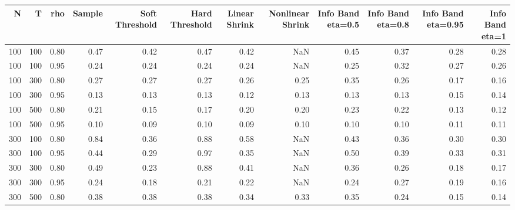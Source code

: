 \begin{tabular}{rrrrrrrrrrrr}
\toprule
  N &   T &  rho &  Sample &  Soft Threshold &  Hard Threshold &  Linear Shrink &  Nonlinear Shrink &  Info Band eta=0.5 &  Info Band eta=0.8 &  Info Band eta=0.95 &  Info Band eta=1 \\
\midrule
100 & 100 & 0.80 &    0.47 &            0.42 &            0.47 &           0.42 &               NaN &               0.45 &               0.37 &                0.28 &             0.28 \\
100 & 100 & 0.95 &    0.24 &            0.24 &            0.24 &           0.24 &               NaN &               0.25 &               0.32 &                0.27 &             0.26 \\
100 & 300 & 0.80 &    0.27 &            0.27 &            0.27 &           0.26 &              0.25 &               0.35 &               0.26 &                0.17 &             0.16 \\
100 & 300 & 0.95 &    0.13 &            0.13 &            0.13 &           0.12 &              0.13 &               0.13 &               0.13 &                0.15 &             0.14 \\
100 & 500 & 0.80 &    0.21 &            0.15 &            0.17 &           0.20 &              0.20 &               0.23 &               0.22 &                0.13 &             0.12 \\
100 & 500 & 0.95 &    0.10 &            0.09 &            0.10 &           0.09 &              0.10 &               0.10 &               0.10 &                0.11 &             0.11 \\
300 & 100 & 0.80 &    0.84 &            0.36 &            0.88 &           0.58 &               NaN &               0.43 &               0.36 &                0.30 &             0.30 \\
300 & 100 & 0.95 &    0.44 &            0.29 &            0.97 &           0.35 &               NaN &               0.50 &               0.39 &                0.33 &             0.31 \\
300 & 300 & 0.80 &    0.49 &            0.23 &            0.88 &           0.41 &               NaN &               0.36 &               0.26 &                0.18 &             0.17 \\
300 & 300 & 0.95 &    0.24 &            0.18 &            0.21 &           0.22 &               NaN &               0.24 &               0.27 &                0.19 &             0.16 \\
300 & 500 & 0.80 &    0.38 &            0.38 &            0.38 &           0.34 &              0.33 &               0.35 &               0.24 &                0.15 &             0.14 \\

\end{tabular}
